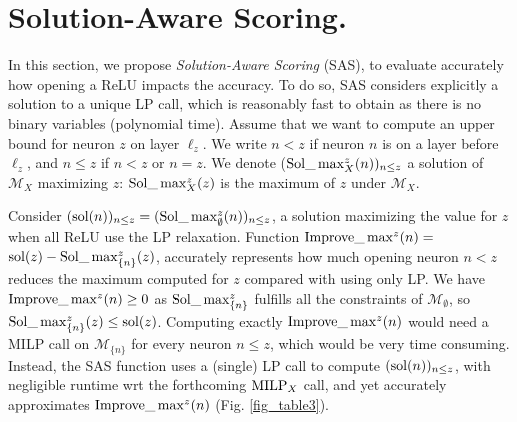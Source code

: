 \section{Solution-Aware Scoring.}

\label{sec4}

In this section, we propose {\em Solution-Aware Scoring} (SAS),
to evaluate accurately how opening a ReLU impacts the accuracy.
To do so, SAS considers explicitly a solution to a unique LP call, which is reasonably fast to obtain as there is no binary variables (polynomial time). 
Assume that we want to compute an upper bound for neuron $z$ on layer $\ell_z$.
We write $n < z$ if neuron $n$ is on a layer before $\ell_z$, and $n \leq z$ if $n< z$ or $n=z$. We denote ($\mathrm{Sol}\_\max_X^z(n))_{n \leq z}$ a solution of $\mathcal{M}_X$ maximizing $z$: $\mathrm{Sol}\_\max_X^z(z)$ is the maximum of $z$ under $\mathcal{M}_X$.

Consider $(\mathrm{sol}(n))_{n \leq z} = (\mathrm{Sol}\_\max_\emptyset^z(n))_{n \leq z}$, a solution maximizing the value for $z$ when all ReLU use the LP relaxation.
Function
$\mathrm{Improve}\_\max^z(n)=$ $\mathrm{sol}(z) - \mathrm{Sol}\_\max_{\{n\}}^z(z)$, 
accurately represents how much opening neuron $n < z$ reduces the maximum computed for $z$
compared with using only LP. 
We have $\mathrm{Improve}\_\max^z(n)\geq 0$ as $\mathrm{Sol}\_\max_{\{n\}}^z$ fulfills all the constraints of 
$\mathcal{M}_\emptyset$, so $\mathrm{Sol}\_\max_{\{n\}}^z(z) \leq \mathrm{sol}(z)$.
Computing exactly $\mathrm{Improve}\_\max^z(n)$ would need a MILP call on $\mathcal{M}_{\{n\}}$ for every neuron $n \leq z$, which would be very time consuming. Instead, the SAS function uses a (single) LP call to compute $(\mathrm{sol}(n))_{n \leq z}$, with negligible runtime wrt the forthcoming  ${\textrm{MILP}}_X$ call, and yet accurately approximates $\mathrm{Improve}\_\max^z(n)$ 
(Fig. \ref{fig_table3}).


\iffalse
That's why as far as we know, in competing heuristics to rank important nodes (e.g. \cite{BaB,huang2017safety,ferrari2022complete}), no call to solvers are made.
\fi





